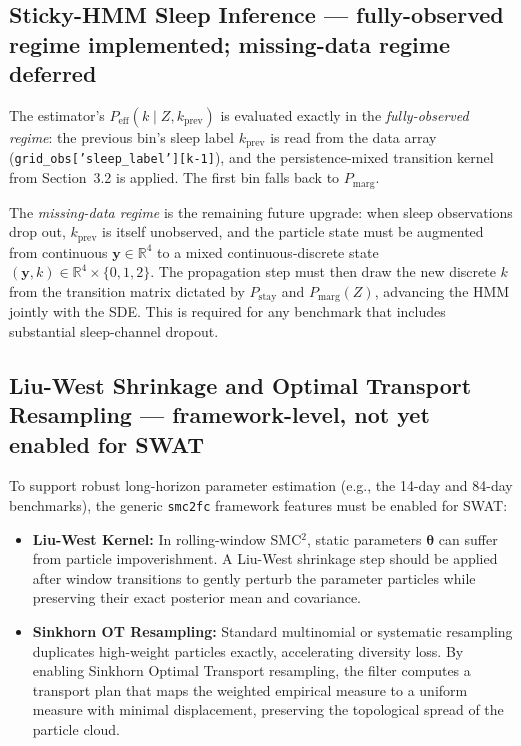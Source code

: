 \documentclass[11pt,a4paper]{article}
\begin{document}
\subsection{Sticky-HMM Sleep Inference --- fully-observed regime implemented; missing-data regime deferred}
The estimator's $P_{\text{eff}}(k \mid Z, k_{\text{prev}})$ is evaluated exactly in the \textit{fully-observed regime}: the previous bin's sleep label $k_{\text{prev}}$ is read from the data array (\texttt{grid\_obs['sleep\_label'][k-1]}), and the persistence-mixed transition kernel from Section~3.2 is applied. The first bin falls back to $P_{\text{marg}}$.

The \textit{missing-data regime} is the remaining future upgrade: when sleep observations drop out, $k_{\text{prev}}$ is itself unobserved, and the particle state must be augmented from continuous $\mathbf{y} \in \mathbb{R}^4$ to a mixed continuous-discrete state $(\mathbf{y}, k) \in \mathbb{R}^4 \times \{0,1,2\}$. The propagation step must then draw the new discrete $k$ from the transition matrix dictated by $P_{\text{stay}}$ and $P_{\text{marg}}(Z)$, advancing the HMM jointly with the SDE. This is required for any benchmark that includes substantial sleep-channel dropout.

\subsection{Liu-West Shrinkage and Optimal Transport Resampling --- framework-level, not yet enabled for SWAT}
To support robust long-horizon parameter estimation (e.g., the 14-day and 84-day benchmarks), the generic \texttt{smc2fc} framework features must be enabled for SWAT:
\begin{itemize}
    \item \textbf{Liu-West Kernel:} In rolling-window SMC$^2$, static parameters $\boldsymbol{\theta}$ can suffer from particle impoverishment. A Liu-West shrinkage step should be applied after window transitions to gently perturb the parameter particles while preserving their exact posterior mean and covariance.
    \item \textbf{Sinkhorn OT Resampling:} Standard multinomial or systematic resampling duplicates high-weight particles exactly, accelerating diversity loss. By enabling Sinkhorn Optimal Transport resampling, the filter computes a transport plan that maps the weighted empirical measure to a uniform measure with minimal displacement, preserving the topological spread of the particle cloud.
\end{itemize}
\end{document}
